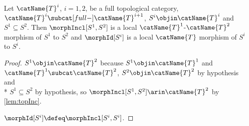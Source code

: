\documentclass{article}
\begin{document}
\begin{corollary}
\label{cor:topLocal}
Let $\catName{T}^i$, $i=1,2$, be a full topological category,
$\catName{T}^i \subcat[full-] \catName{T}^{i+1}$,
$S^i \objin \catName{T}^i$ and $S^1 \subseteq S^2$. Then $\morphIncl[S^1,S^2]$
is a local $\catName{T}^1$-$\catName{T}^2$ morphism of $S^1$ to $S^2$
and $\morphId[{S^i}]$ is a local $\catName{T}$ morphism
of $S^i$ to $S^i$.

\begin{proof}
$S^1 \objin \catName{T}^2$ because $S^1 \objin \catName{T}^1$ and
$\catName{T}^1 \subcat \catName{T}^2$,
$S^2 \objin \catName{T}^2$ by hypothesis and \\*
$S^1 \subseteq S^2$ by hypothesis, so
$\morphIncl[S^1,S^2] \arin \catName{T}^2$ by \cref{lem:topInc}.

$\morphId[S^i] \defeq \morphIncl[S^i,S^i]$.
\end{proof}
\end{corollary}
\end{document}
